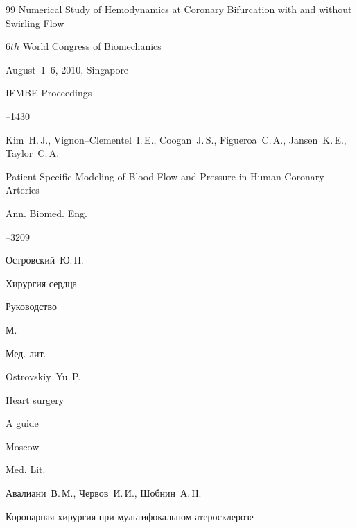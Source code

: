 \begin{thebibliography}{99}
\paper Numerical Study of Hemodynamics at Coronary Bifurcation with and without Swirling Flow 

\inbook $6th$ World Congress of Biomechanics

\procinfo August~1--6, 2010, Singapore

\serial IFMBE Proceedings



--1430





\by Kim~H.\,J., Vignon--Clementel~I.\,E., Coogan~J.\,S., Figueroa~C.\,A., Jansen~K.\,E., Taylor~C.\,A.

\paper Patient-Specific Modeling of Blood Flow and Pressure in Human Coronary Arteries 

\jour Ann. Biomed. Eng.




--3209






\by Островский~Ю.\,П.

\book Хирургия сердца

\bookinfo Руководство

\publaddr М.

\publ Мед. лит.



\misctransl

\by Ostrovskiy~Yu.\,P.

\book  Heart surgery

\bookinfo A guide

\publaddr Moscow

\publ  Med. Lit.








\by Авалиани~В.\,М., Червов~И.\,И., Шобнин~А.\,Н.

\book Коронарная хирургия при мультифокальном атеросклерозе


\end{thebibliography}
